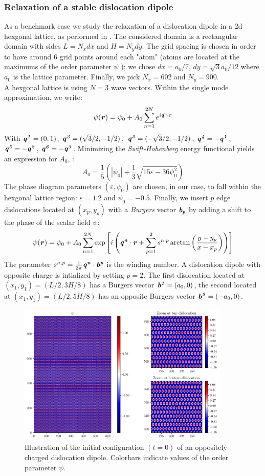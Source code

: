 \documentclass{article}
\begin{document}
\subsubsection{Relaxation of a stable dislocation dipole}
As a benchmark case we study the relaxation of a dislocation dipole in a 2d hexgonal lattice, as performed in \cite{upadhyayCouplingPhaseField2024}. The considered domain is a rectangular domain with sides $L=N_x dx$ and $H=N_y dy$. The grid spacing is chosen in order to have around 6 grid points around each "atom" (atoms are located at the maximums of the order parameter $\psi$ ); we chose $dx=a_0/7$, $dy=\sqrt{3}a_0/12$ where $a_0$ is the lattice parameter. Finally, we pick $N_x=602$ and $N_y=900$.\\
A hexgonal lattice is using $N=3$ wave vectors. Within the single mode approximation, we write:
\begin{equation}
   \psi(\bm{\mathit{r}}) = \psi_0 +  A_0\sum_{n=1}^{2N}e^{i\bm{\mathit{q^n}}\cdot \bm{\mathit{r}}}
\end{equation}
With $\bm{\mathit{q^1}}=(0,1)$, $\bm{\mathit{q^2}}=(\sqrt{3}/2,-1/2)$, $\bm{\mathit{q^3}}=(-\sqrt{3}/2,-1/2)$, $\bm{\mathit{q^4}}=-\bm{\mathit{q^1}}$,$\bm{\mathit{q^5}}=-\bm{\mathit{q^2}}$, $\bm{\mathit{q^6}}=-\bm{\mathit{q^3}}$. Minimizing the \emph{Swift-Hohenberg} energy functional yields an expression for $A_0$, \cite{elderModelingelastic2004}:
\begin{equation}
   A_0 = \frac{1}{5} \left(|\psi_0|+\frac{1}{3} \sqrt{15\varepsilon-36 \psi_0^2} \right)
\end{equation}
The phase diagram parameters $(\varepsilon,\psi_0)$ are chosen, in our case, to fall within the hexgonal lattice region: $\varepsilon=1.2$ and $\psi_0=-0.5$. Finally, we insert $p$ edge dislocations located at $(x_p,y_p)$ with a \emph{Burgers} vector $\bm{\mathit{b_p}}$ by adding a shift to the phase of the scalar field $\psi$:
\begin{equation}
   \psi(\bm{\mathit{r}}) = \psi_0 +  A_0\sum_{n=1}^{2N}\exp \left[ i \left(\bm{\mathit{q^n}}\cdot \bm{\mathit{r}}+ \sum_{p=1}^{2}s^{n,p} \arctan \left(\frac{y-y_p}{x-x_p}\right)\right) \right]
\end{equation}
The parameter $s^{n,p}= \frac{1}{2\pi}\bm{\mathit{q^n}} \cdot \bm{\mathit{b^p}}$ is the winding number. A dislocation dipole with opposite charge is intialized by setting $p=2$. The first dislocation located at $(x_1,y_1)=(L/2,3H/8)$ has a Burgers vector $\bm{\mathit{b^1}}=(a_0,0)$, the second located at $(x_1,y_1)=(L/2,5H/8)$ has an opposite Burgers vector $\bm{\mathit{b^2}}=(-a_0,0)$.
\begin{figure}[H]
   \centering
   \includegraphics[width=0.9\textwidth]{imgs/weakcoupling/dipole/dipoleinit.png}
   \caption{Illustration of the initial configuration $(t=0)$ of an oppositely charged dislocation dipole. Colorbars indicate values of the order parameter $\psi$.}
\end{figure}
\end{document}
